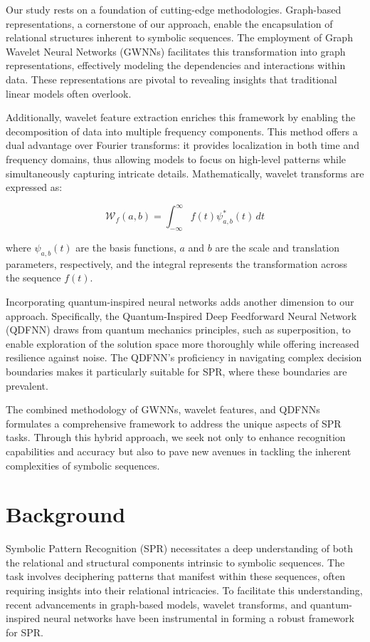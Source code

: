 \documentclass{article}
\begin{document}
Our study rests on a foundation of cutting-edge methodologies. Graph-based representations, a cornerstone of our approach, enable the encapsulation of relational structures inherent to symbolic sequences. The employment of Graph Wavelet Neural Networks (GWNNs) facilitates this transformation into graph representations, effectively modeling the dependencies and interactions within data. These representations are pivotal to revealing insights that traditional linear models often overlook.

Additionally, wavelet feature extraction enriches this framework by enabling the decomposition of data into multiple frequency components. This method offers a dual advantage over Fourier transforms: it provides localization in both time and frequency domains, thus allowing models to focus on high-level patterns while simultaneously capturing intricate details. Mathematically, wavelet transforms are expressed as:

\[
\mathcal{W}_f(a, b) = \int_{-\infty}^{\infty} f(t) \psi^*_{a,b}(t) \, dt
\]

where \( \psi_{a,b}(t) \) are the basis functions, \( a \) and \( b \) are the scale and translation parameters, respectively, and the integral represents the transformation across the sequence \( f(t) \).

Incorporating quantum-inspired neural networks adds another dimension to our approach. Specifically, the Quantum-Inspired Deep Feedforward Neural Network (QDFNN) draws from quantum mechanics principles, such as superposition, to enable exploration of the solution space more thoroughly while offering increased resilience against noise. The QDFNN's proficiency in navigating complex decision boundaries makes it particularly suitable for SPR, where these boundaries are prevalent.

The combined methodology of GWNNs, wavelet features, and QDFNNs formulates a comprehensive framework to address the unique aspects of SPR tasks. Through this hybrid approach, we seek not only to enhance recognition capabilities and accuracy but also to pave new avenues in tackling the inherent complexities of symbolic sequences.

\section{Background}

Symbolic Pattern Recognition (SPR) necessitates a deep understanding of both the relational and structural components intrinsic to symbolic sequences. The task involves deciphering patterns that manifest within these sequences, often requiring insights into their relational intricacies. To facilitate this understanding, recent advancements in graph-based models, wavelet transforms, and quantum-inspired neural networks have been instrumental in forming a robust framework for SPR.
\end{document}
